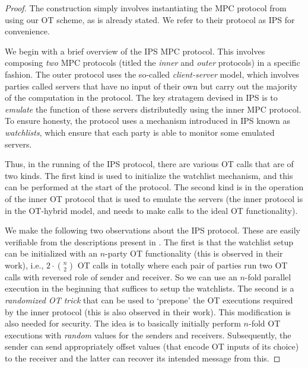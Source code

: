 \begin{proof}
    The construction simply involves instantiating the MPC protocol from \cite{C:IshPraSah08} using our OT scheme, as is already stated. We refer to their protocol as IPS for convenience. 
    
    We begin with a brief overview of the IPS MPC protocol. This involves composing {\em two} MPC protocols (titled the {\em inner} and {\em outer} protocols) in a specific fashion. The outer protocol uses the so-called {\em client-server} model, which involves parties called servers that have no input of their own but carry out the majority of the computation in the protocol. The key stratagem devised in IPS is to {\em emulate} the function of these servers distributedly using the inner MPC protocol. To ensure honesty, the protocol uses a mechanism introduced in IPS known as {\em watchlists}, which ensure that each party is able to monitor some emulated servers. 

    Thus, in the running of the IPS protocol, there are various OT calls that are of two kinds. The first kind is used to initialize the watchlist mechanism, and this can be performed at the start of the protocol. The second kind is in the operation of the inner OT protocol that is used to emulate the servers (the inner protocol is in the OT-hybrid model, and needs to make calls to the ideal OT functionality). 

    We make the following two observations about the IPS protocol. These are easily verifiable from the descriptions present in \cite{C:IshPraSah08}. The first is that the watchlist setup can be initialized with an $n$-party OT functionality (this is observed in their work), i.e., $2\cdot\binom{n}{2}$ OT calls in totally where each pair of parties run two OT calls with reversed role of sender and receiver. So we can use an $n$-fold parallel execution  in the beginning that suffices to setup the watchlists. The second is a {\em randomized OT trick} that can be used to `prepone' the OT executions required by the inner protocol (this is also observed in their work). This modification is also needed for security. The idea is to basically initially perform $n$-fold OT executions with {\em random} values for the senders and receivers. Subsequently, the sender can send appropriately offset values (that encode OT inputs of its choice) to the receiver and the latter can recover its intended message from this. 


\end{proof}
